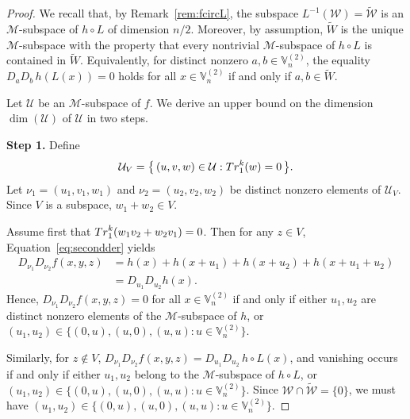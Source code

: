 \documentclass[10pt,a4paper]{amsart}
\newcommand{\Tr}{{\rm Tr}}
\newcommand{\V}{\mathbb{V}}
\begin{document}
	\begin{proof}
		We recall that, by Remark~\ref{rem:fcircL}, the subspace
		\(L^{-1}(\mathcal{W}) = \widetilde{\mathcal{W}}\) is an \(\mathcal{M}\)-subspace of
		\(h \circ L\) of dimension \(n/2\).
		Moreover, by assumption, \(\widetilde{W}\) is the unique
		\(\mathcal{M}\)-subspace with the property that every nontrivial
		\(\mathcal{M}\)-subspace of \(h\circ L\) is contained in \(\widetilde{W}\).
		Equivalently, for {distinct} nonzero
		\({a},{b}\in \V_n^{(2)}\), the equality $D_{{a}}D_{{b}} \, h (L (x))=0$ holds for all $x\in \V_n^{(2)}$
		if and only if \({a},{b}\in \widetilde{W}\).
		
		\medskip
		
		Let \(\mathcal{U}\) be an \(\mathcal{M}\)-subspace of \(f\).
		We derive an upper bound on the dimension \(\dim(\mathcal{U})\) of $\mathcal{U}$ in two steps.
		
		\medskip
		\noindent\textbf{Step 1.}
		Define
		\begin{equation}\label{eq:UV}
			\mathcal{U}_V
			=
			\bigl\{\,
			(u,v,w)\in \mathcal{U} : \Tr_1^k(w)=0
			\,\bigr\}.
		\end{equation}
		Let
		\(\nu_1=(u_1,v_1,w_1)\) and \(\nu_2=(u_2,v_2,w_2)\)
		be distinct nonzero elements of \(\mathcal{U}_V\).
		Since \(V\) is a subspace, \(w_1+w_2\in V\).
		
		Assume first that
		\(\Tr_1^k(w_1v_2+w_2v_1)=0\).
		Then for any \(z\in V\),
		Equation~\eqref{eq:secondder} yields
		\begin{align*}
			D_{\nu_1}D_{\nu_2}f(x,y,z)
			&= h(x)+h(x+u_1)+h(x+u_2)+h(x+u_1+u_2) \\
			&= D_{u_1}D_{u_2}h(x).
		\end{align*}
		Hence,
		\(D_{\nu_1}D_{\nu_2}f(x,y,z)=0\) for all \(x\in \V_n^{(2)}\)
		if and only if either
		\(u_1,u_2\) are distinct nonzero elements of the
		\(\mathcal{M}\)-subspace of \(h\), or $(u_1,u_2)\in \{(0,u),(u,0),(u,u):u\in \V_n^{(2)}\}$.
		
		Similarly, for \(z\notin V\), $D_{\nu_1}D_{\nu_2}f(x,y,z)
		= D_{u_1}D_{u_2}\, h\circ L(x)$,
		and vanishing occurs if and only if either
		\(u_1,u_2\) belong to the \(\mathcal{M}\)-subspace of
		\(h\circ L\), or  $(u_1,u_2)\in \{(0,u),(u,0),(u,u):u\in \V_n^{(2)}\}$.
		Since \(\mathcal{W}\cap \widetilde{\mathcal{W}}=\{0\}\),
		we must have $(u_1,u_2)\in \{(0,u),(u,0),(u,u):u\in \V_n^{(2)}\}$.
		

\end{proof}
\end{document}
